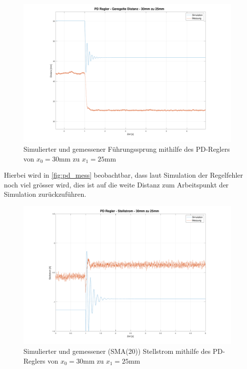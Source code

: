		\begin{figure}[H]
				\centering
				\includegraphics[width=\textwidth]{./figure/PD_mess_distanz.pdf}
				\caption{Simulierter und gemessener Führungssprung mithilfe des PD-Reglers von $x_0 = 30\si{\milli\meter}$ zu $x_1 = 25\si{\milli\meter}$}
				\label{fig:pd_mess}
			\end{figure}
			Hierbei wird in \autoref{fig:pd_mess} beobachtbar, dass laut Simulation der Regelfehler noch viel grösser wird, dies ist auf die weite Distanz zum Arbeitspunkt der Simulation zurückzuführen.

		\begin{figure}[H]
				\centering
				\includegraphics[width=\textwidth]{./figure/PD_mess_stellstrom.pdf}
				\caption{Simulierter und gemessener (SMA(20)) Stellstrom mithilfe des PD-Reglers von $x_0 = 30\si{\milli\meter}$ zu $x_1 = 25\si{\milli\meter}$}
				\label{fig:pd_mess_strom}
			\end{figure}


